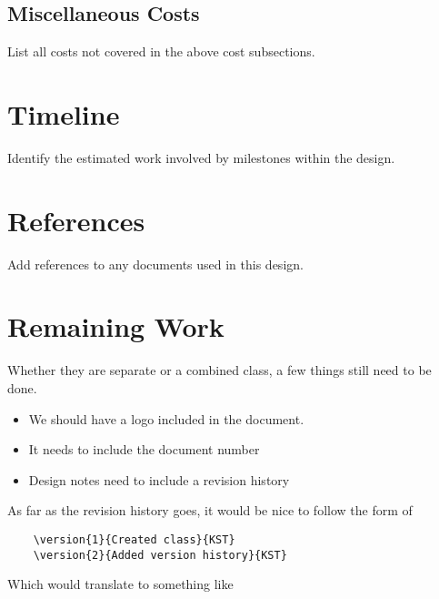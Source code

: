 \documentclass{mxl-design}
\begin{document}
\subsection{Miscellaneous Costs}

List all costs not covered in the above cost subsections.

\section{Timeline}

Identify the estimated work involved by milestones within the design.

\section{References}

Add references to any documents used in this design.

\section{Remaining Work}

Whether they are separate or a combined class, a few things still need to be done.

\begin{itemize}
	\item We should have a logo included in the document.
	\item It needs to include the document number
	\item Design notes need to include a revision history
\end{itemize}

As far as the revision history goes, it would be nice to follow the form of

\begin{verbatim}
	\version{1}{Created class}{KST}
	\version{2}{Added version history}{KST}
\end{verbatim}

Which would translate to something like
\end{document}
